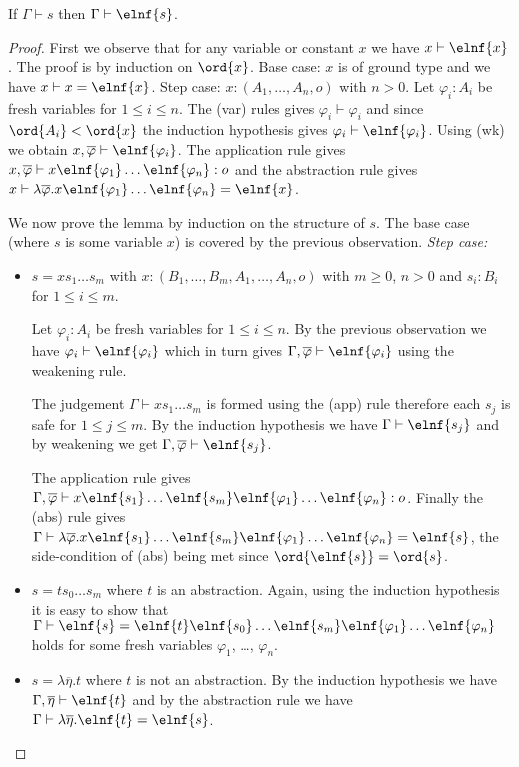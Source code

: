 \begin{lemma}
If $\Gamma \vdash s$ then $\Gamma \vdash \elnf{s}$.
\end{lemma}
\begin{proof}

First we observe that for any variable or constant $x$ we have $x \vdash \elnf{x}$. The proof is by induction on $\ord{x}$. Base case: $x$ is of ground type and we have $x \vdash x = \elnf{x}$. Step case:
$x:(A_1, \ldots, A_n,o)$ with $n>0$. Let $\varphi_i:A_i$ be fresh variables for $1\leq i\leq n$. The (var) rules gives $\varphi_i  \vdash \varphi_i$ and since $\ord{A_i} < \ord{x}$ the induction hypothesis gives $\varphi_i \vdash \elnf{\varphi_i}$. Using (wk) we obtain $x, \overline{\varphi} \vdash \elnf{\varphi_i}$.
The application rule gives $x, \overline{\varphi} \vdash x \elnf{\varphi_1} \ldots \elnf{\varphi_n} : o$ and the abstraction rule gives $ x \vdash \lambda \overline{\varphi} . x \elnf{\varphi_1} \ldots \elnf{\varphi_n} = \elnf{x}$.


We now prove the lemma by induction on the structure of $s$.
The base case (where $s$ is some variable $x$) is covered by the previous observation.
\emph{Step case:}
\begin{itemize}
\item $s = x s_1 \ldots s_m$ with $x: (B_1, \ldots, B_m, A_1, \ldots, A_n, o)$ with $m\geq 0$, $n>0$ and $s_i : B_i$ for $1 \leq i \leq m$.

Let $\varphi_i: A_i$ be fresh variables for $1\leq i \leq n$. By the previous observation we have $\varphi_i \vdash \elnf{\varphi_i}$ which in turn gives $\Gamma , \overline{\varphi} \vdash \elnf{\varphi_i}$ using the weakening rule.

The judgement $\Gamma \vdash x s_1 \ldots s_m$ is formed using the (app) rule therefore each $s_j$ is safe for $1\leq j \leq m$. By the induction hypothesis we have $\Gamma \vdash \elnf{s_j}$ and by weakening we get $\Gamma, \overline{\varphi} \vdash \elnf{s_j}$.

The application rule gives $\Gamma, \overline{\varphi} \vdash
x \elnf{s_1} \ldots \elnf{s_m} \elnf{\varphi_1} \ldots \elnf{\varphi_n} : o$. Finally the (abs) rule gives $\Gamma \vdash \lambda \overline{\varphi} . x \elnf{s_1} \ldots \elnf{s_m}  \elnf{\varphi_1} \ldots \elnf{\varphi_n} = \elnf{s}$, the side-condition of (abs) being met since $\ord{\elnf{s}} = \ord{s}$.


\item $s = t s_0 \ldots s_m$ where $t$ is an abstraction. Again, using the induction hypothesis it is easy to show that $\Gamma \vdash \elnf{s} = \elnf{t} \elnf{s_0} \ldots \elnf{s_m} \elnf{\varphi_1} \ldots \elnf{\varphi_n}$ holds for some fresh variables $\varphi_1$, \ldots, $\varphi_n$.

\item $s = \lambda \overline{\eta} . t$ where $t$ is not an abstraction. By the induction hypothesis we have $\Gamma, \overline{\eta} \vdash \elnf{t}$ and by the abstraction rule we have $\Gamma \vdash \lambda \overline{\eta} . \elnf{t} = \elnf{s}$.
\end{itemize}
\end{proof}

